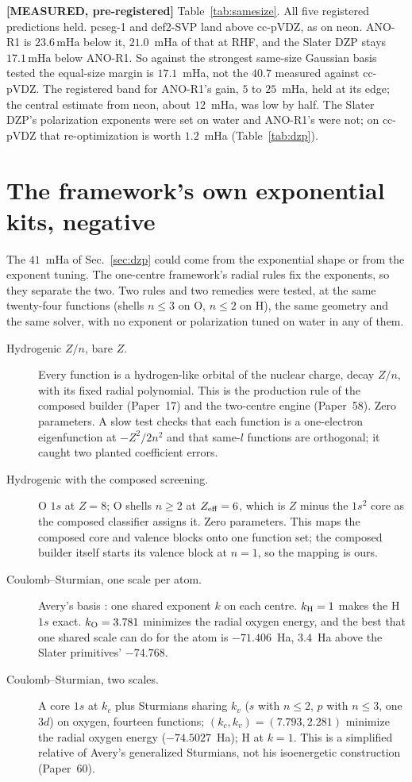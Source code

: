 \documentclass[aps,pra,twocolumn,superscriptaddress,longbibliography]{revtex4-2}
\newcommand{\gvq}[2]{#2}
\newcommand{\mHa}{\,\mathrm{mHa}}
\begin{document}
\textbf{[MEASURED, pre-registered]}  Table~\ref{tab:samesize}.  All five
registered predictions held.  pcseg-1 and def2-SVP land above cc-pVDZ,
as on neon.  ANO-R1 is $\gvq{p62_anor1_vs_ccpvdz_mha}{23.6}\mHa$ below
it, $21.0$~mHa of that at RHF, and the Slater DZP stays
$\gvq{p62_dzp_vs_anor1_mha}{17.1}\mHa$ below ANO-R1.  So against the
strongest same-size Gaussian basis tested the equal-size margin is
$17.1$~mHa, not the $40.7$ measured against cc-pVDZ.  The registered band
for ANO-R1's gain, $5$ to $25$~mHa, held at its edge; the central
estimate from neon, about $12$~mHa, was low by half.  The Slater DZP's
polarization exponents were set on water and ANO-R1's were not; on
cc-pVDZ that re-optimization is worth $1.2$~mHa (Table~\ref{tab:dzp}).

\section{The framework's own exponential kits, negative}
\label{sec:native}

The $41$~mHa of Sec.~\ref{sec:dzp} could come from the exponential
shape or from the exponent tuning.  The one-centre framework's radial
rules fix the exponents, so they separate the two.  Two rules and two
remedies were tested, at the same twenty-four functions (shells
$n\le3$ on O, $n\le2$ on H), the same geometry and the same solver, with
no exponent or polarization tuned on water in any of them.

\begin{description}
\item[Hydrogenic $Z/n$, bare $Z$.]  Every function is a hydrogen-like
orbital of the nuclear charge, decay $Z/n$, with its fixed radial
polynomial.  This is the production rule of the composed builder
(Paper~17) and the two-centre engine (Paper~58).  Zero parameters.  A
slow test checks that each function is a one-electron eigenfunction at
$-Z^{2}/2n^{2}$ and that same-$l$ functions are orthogonal; it caught
two planted coefficient errors.
\item[Hydrogenic with the composed screening.]  O $1s$ at $Z=8$; O
shells $n\ge2$ at $Z_{\rm eff}=6$, which is $Z$ minus the $1s^{2}$ core
as the composed classifier assigns it.  Zero parameters.  This maps
the composed core and valence blocks onto one function set; the
composed builder itself starts its valence block at $n=1$, so the
mapping is ours.
\item[Coulomb--Sturmian, one scale per atom.]  Avery's basis
\cite{avery2006}: one shared exponent $k$ on each centre.  $k_{\rm H}=1$
makes the H $1s$ exact.  $k_{\rm O}=3.781$ minimizes the radial oxygen
energy, and the best that one shared scale can do for the atom is
$-71.406$~Ha, $3.4$~Ha above the Slater primitives' $-74.768$.
\item[Coulomb--Sturmian, two scales.]  A core $1s$ at $k_{c}$ plus
Sturmians sharing $k_{v}$ ($s$ with $n\le2$, $p$ with $n\le3$, one
$3d$) on oxygen, fourteen functions; $(k_{c},k_{v})=(7.793, 2.281)$
minimize the radial oxygen energy ($-74.5027$~Ha); H at $k=1$.  This is
a simplified relative of Avery's generalized Sturmians, not his
isoenergetic construction (Paper~60).
\end{description}
\end{document}
